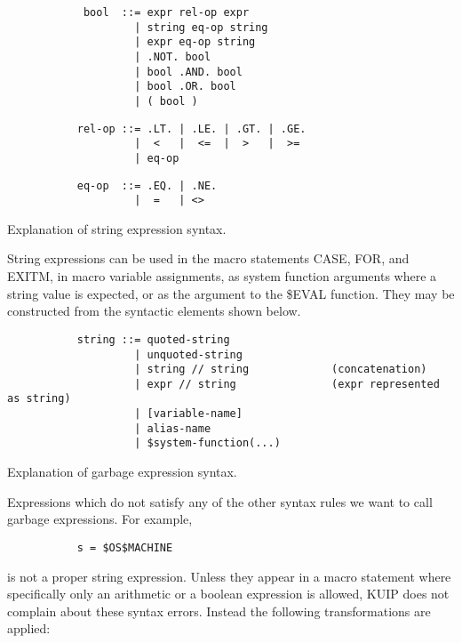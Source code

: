 \begin{verbatim}
            bool  ::= expr rel-op expr
                    | string eq-op string
                    | expr eq-op string
                    | .NOT. bool
                    | bool .AND. bool
                    | bool .OR. bool
                    | ( bool )
\end{verbatim}
\begin{verbatim}
           rel-op ::= .LT. | .LE. | .GT. | .GE.
                    |  <   |  <=  |  >   |  >=
                    | eq-op
\end{verbatim}
\begin{verbatim}
           eq-op  ::= .EQ. | .NE.
                    |  =   | <>
\end{verbatim}

\ENDCMD


   \par
Explanation of string expression syntax.  

   \par
String expressions can be used in the macro statements CASE, FOR, and 
   EXITM, in macro variable assignments, as system function arguments where a 
   string value is expected, or as the argument to the \$EVAL function. They 
   may be constructed from the syntactic elements shown below.  

\begin{verbatim}
           string ::= quoted-string
                    | unquoted-string
                    | string // string             (concatenation)
                    | expr // string               (expr represented as string)
                    | [variable-name]
                    | alias-name
                    | $system-function(...)
\end{verbatim}

\ENDCMD


   \par
Explanation of \DQUOTE{}garbage\DQUOTE{} expression syntax.  

   \par
Expressions which do not satisfy any of the other syntax rules we want to 
   call \DQUOTE{}garbage\DQUOTE{} expressions.  For example, 

\begin{verbatim}
           s = $OS$MACHINE
\end{verbatim}
\ENDVERB
   \par
is not a proper string expression. Unless they appear in a macro statement 
   where specifically only an arithmetic or a boolean expression is allowed, 
   KUIP does not complain about these syntax errors. Instead the following 
   transformations are applied:  

